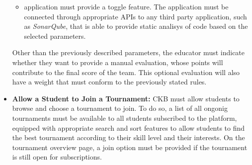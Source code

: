 \documentclass[a4paper, 11pt, titlepage]{article}
\begin{document}
\begin{itemize}
\begin{itemize}
        \item application must provide a toggle feature. The application must be connected through appropriate APIs to any third party application, such as \textit{SonarQube}, that is able to provide static analisys of code based on the selected parameters.    
    \end{itemize} 
    Other than the previously described parameters, the educator must indicate whether they want to provide a manual evaluation, whose points will contribute to the final score of the team. This optional evaluation will also have a weight that must
    conform to the previously stated rules.
    
    \item \textbf{Allow a Student to Join a Tournament:} CKB must allow students to browse and choose a tournament to join. To do so, a list of all ongonig tournaments must be available to all students subscribed to the platform, equipped with 
    appropriate search and sort features to allow students to find the best tournament according to their skill level and their interests. On the tournament overview page, a join option must be provided if the tournament is still open for subscriptions.
    

\end{itemize}
\end{document}
